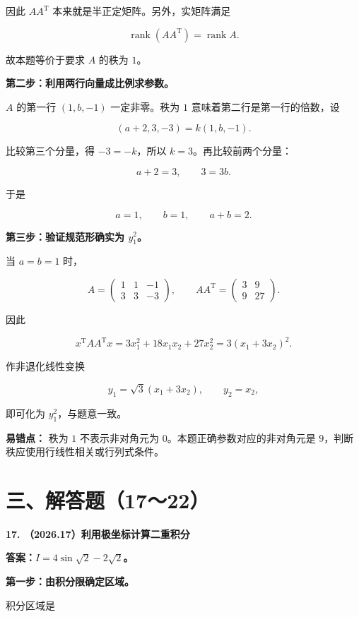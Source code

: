 \documentclass[UTF8,11pt,fontset=windows]{ctexart}
\begin{document}
因此 $AA^{\mathrm T}$ 本来就是半正定矩阵。另外，实矩阵满足

$$
\operatorname{rank}(AA^{\mathrm T})=\operatorname{rank}A.
$$

故本题等价于要求 $A$ 的秩为 $1$。

\textbf{第二步：利用两行向量成比例求参数。}

$A$ 的第一行 $(1,b,-1)$ 一定非零。秩为 $1$ 意味着第二行是第一行的倍数，设

$$
(a+2,3,-3)=k(1,b,-1).
$$

比较第三个分量，得 $-3=-k$，所以 $k=3$。再比较前两个分量：

$$
a+2=3,\qquad 3=3b.
$$

于是

$$
a=1,\qquad b=1,\qquad a+b=2.
$$

\textbf{第三步：验证规范形确实为 $y_1^2$。}

当 $a=b=1$ 时，

$$
A=\begin{pmatrix}1&1&-1\\3&3&-3\end{pmatrix},
\qquad
AA^{\mathrm T}=\begin{pmatrix}3&9\\9&27\end{pmatrix}.
$$

因此

$$
x^{\mathrm T}AA^{\mathrm T}x
=3x_1^2+18x_1x_2+27x_2^2
=3(x_1+3x_2)^2.
$$

作非退化线性变换

$$
y_1=\sqrt3(x_1+3x_2),\qquad y_2=x_2,
$$

即可化为 $y_1^2$，与题意一致。

\textbf{易错点：} 秩为 $1$ 不表示非对角元为 $0$。本题正确参数对应的非对角元是 $9$，判断秩应使用行线性相关或行列式条件。

\clearpage

\section*{三、解答题（17～22）}

\textbf{17. （2026.17）利用极坐标计算二重积分}

\textbf{答案：$I=4\sin\sqrt2-2\sqrt2$。}

\textbf{第一步：由积分限确定区域。}

积分区域是
\end{document}
